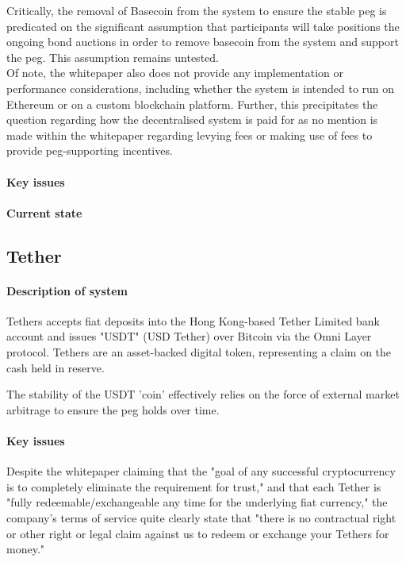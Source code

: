 \documentclass{article}
\begin{document}
\noindent Critically, the removal of Basecoin from the system to ensure the stable peg is predicated on the significant assumption that participants will take positions the ongoing bond auctions in order to remove basecoin from the system and support the peg. This assumption remains untested. \\

\noindent Of note, the whitepaper also does not provide any implementation or performance considerations, including whether the system is intended to run on Ethereum or on a custom blockchain platform. Further, this precipitates the question regarding how the decentralised system is paid for as no mention is made within the whitepaper regarding levying fees or making use of fees to provide peg-supporting incentives. \\



\paragraph{Key issues}

\paragraph{Current state}


\subsection{Tether}

\paragraph{Description of system}

Tethers accepts fiat deposits into the Hong Kong-based Tether Limited bank account and issues "USDT" (USD Tether) over Bitcoin via the Omni Layer protocol. Tethers are an asset-backed digital token, representing a claim on the cash held in reserve.

The stability of the USDT 'coin' effectively relies on the force of external market arbitrage to ensure the peg holds over time.

\paragraph{Key issues}

Despite the whitepaper claiming that the "goal of any successful cryptocurrency is to completely eliminate the requirement for trust," and that each Tether is "fully redeemable/exchangeable any time for the underlying fiat currency," the company's terms of service quite clearly state that "there is no contractual right or other right or legal claim against us to redeem or exchange your Tethers for money."
\end{document}
